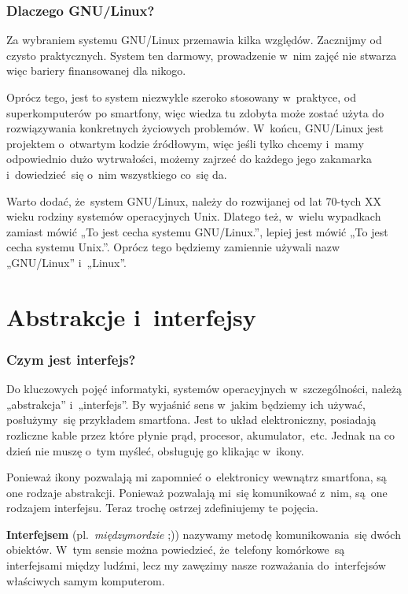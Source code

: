 \documentclass[10pt,t]{beamer}
\begin{document}
\begin{frame}
  \frametitle{Dlaczego GNU/Linux?}


  Za wybraniem systemu GNU/Linux przemawia kilka względów. Zacznijmy od
  czysto praktycznych. System ten darmowy, prowadzenie w~nim zajęć nie
  stwarza więc bariery finansowanej dla nikogo.

  Oprócz tego, jest to system niezwykle szeroko stosowany w~praktyce, od
  superkomputerów po smartfony, więc wiedza tu zdobyta może zostać użyta
  do rozwiązywania konkretnych życiowych problemów. W~końcu, GNU/Linux
  jest projektem o~otwartym kodzie źródłowym, więc jeśli tylko chcemy
  i~mamy odpowiednio dużo wytrwałości, możemy zajrzeć do każdego jego
  zakamarka i~dowiedzieć~się o~nim wszystkiego co~się da.

  Warto dodać, że~system GNU/Linux, należy do rozwijanej od lat 70-tych XX
  wieku rodziny systemów operacyjnych Unix. Dlatego też, w~wielu wypadkach
  zamiast mówić „To jest cecha systemu GNU/Linux.”, lepiej jest mówić „To
  jest cecha systemu Unix.”. Oprócz tego będziemy zamiennie używali
  nazw „GNU/Linux” i~„Linux”.

\end{frame}









\section{Abstrakcje i~interfejsy}


\begin{frame}
  \frametitle{Czym jest interfejs?}


  Do kluczowych pojęć informatyki, systemów operacyjnych w~szczególności,
  należą „abstrakcja” i~„interfejs”. By wyjaśnić sens w~jakim będziemy ich
  używać, posłużymy~się przykładem smartfona. Jest to układ elektroniczny,
  posiadają rozliczne kable przez które płynie prąd, procesor,
  akumulator,~etc. Jednak na co dzień nie muszę o~tym myśleć, obsługuję go
  klikając w~ikony.

  Ponieważ ikony pozwalają mi zapomnieć o~elektronicy wewnątrz smartfona,
  są one rodzaje abstrakcji. Ponieważ pozwalają mi~się komunikować z~nim,
  są~one rodzajem interfejsu. Teraz trochę ostrzej zdefiniujemy te pojęcia.

  \textbf{Interfejsem} (pl.~\textit{międzymordzie} ;)) nazywamy metodę
  komunikowania~się dwóch obiektów. W~tym sensie można powiedzieć,
  że~telefony komórkowe~są interfejsami między ludźmi, lecz my zawęzimy
  nasze rozważania do~interfejsów właściwych samym komputerom.

\end{frame}
\end{document}
